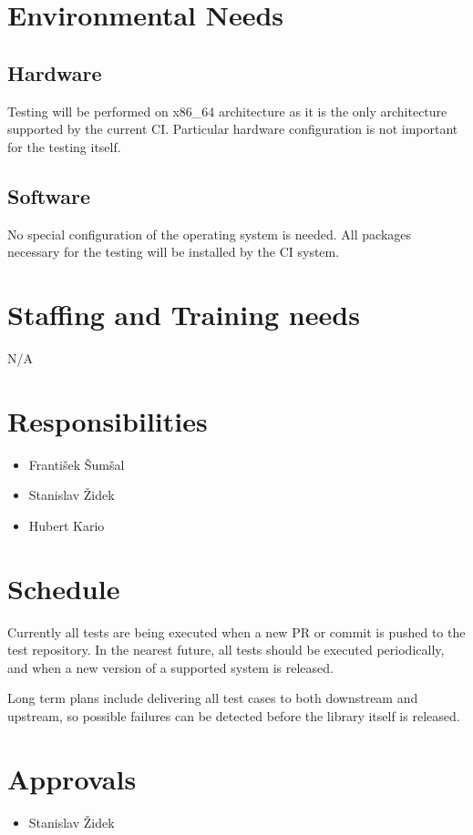 \section{Environmental Needs}
\subsection{Hardware}
    Testing will be performed on x86\_64 architecture as it is the only architecture
    supported by the current CI. Particular hardware configuration is not important
    for the testing itself.

\subsection{Software}
    No special configuration of the operating system is needed. All packages
    necessary for the testing will be installed by the CI system.

\section{Staffing and Training needs}
    N/A

\section{Responsibilities}
    \begin{itemize}
        \item František Šumšal
        \item Stanislav Židek
        \item Hubert Kario
    \end{itemize}

\section{Schedule}
    Currently all tests are being executed when a new PR or commit is pushed
    to the test repository. In the nearest future, all tests should be executed
    periodically, and when a new version of a supported system is released.

    Long term plans include delivering all test cases to both downstream and
    upstream, so possible failures can be detected before the library itself
    is released.

\section{Approvals}
    \begin{itemize}
        \item Stanislav Židek
    \end{itemize}
